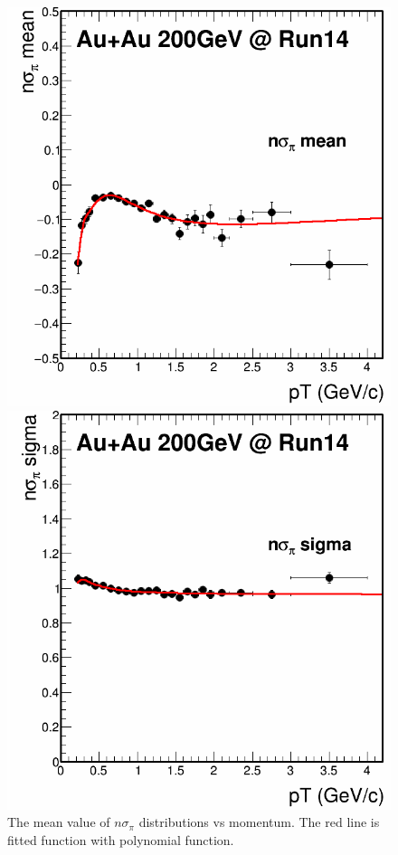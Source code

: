 \begin{figure}[htbp]
\begin{minipage}[htbp]{0.5\linewidth}
\centering
\includegraphics[width=1.0\textwidth]{figure/Run14_D0HFT/nSigPion_mean.png}
\caption{The mean value of $n\sigma_{\pi}$ distributions vs momentum. The red line is fitted function with polynomial function. \label{fig:pionmean}}
\end{minipage}
\hfill
\begin{minipage}[htbp]{0.5\linewidth}
\centering
\includegraphics[width=1.0\textwidth]{figure/Run14_D0HFT/nSigPion_sigma.png}

\end{minipage}
\end{figure}
